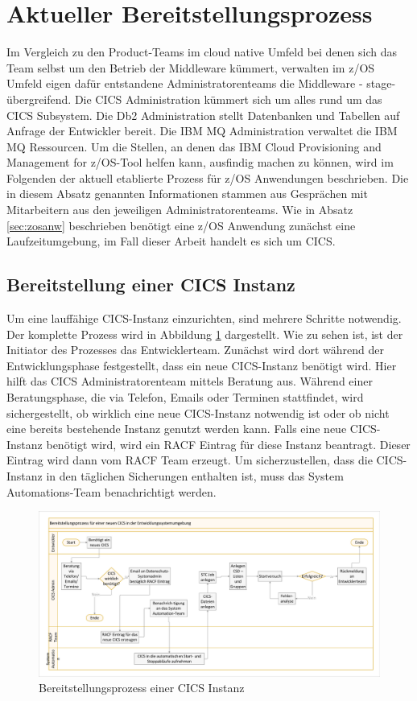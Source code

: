 \section{Aktueller Bereitstellungsprozess}\label{sec:aktbereit}
Im Vergleich zu den Product-Teams im cloud native Umfeld bei denen sich das Team selbst um den Betrieb der Middleware kümmert, verwalten im z/OS Umfeld eigen dafür entstandene Administratorenteams die Middleware - stage-übergreifend.
Die \glqq CICS Administration\grqq{} kümmert sich um alles rund um das CICS Subsystem.
Die \glqq Db2 Administration\grqq{} stellt Datenbanken und Tabellen auf Anfrage der Entwickler bereit.
Die \glqq IBM MQ Administration\grqq{} verwaltet die IBM MQ Ressourcen.
Um die Stellen, an denen das \glqq IBM Cloud Provisioning and Management for z/OS\grqq-Tool helfen kann, ausfindig machen zu können, wird im Folgenden der aktuell etablierte Prozess für z/OS Anwendungen beschrieben.
Die in diesem Absatz genannten Informationen stammen aus Gesprächen mit Mitarbeitern aus den jeweiligen Administratorenteams.
Wie in Absatz \ref{sec:zosanw} beschrieben benötigt eine z/OS Anwendung zunächst eine Laufzeitumgebung, im Fall dieser Arbeit handelt es sich um CICS.

\subsection{Bereitstellung einer CICS Instanz}\label{ssec:aktcics}
Um eine lauffähige CICS-Instanz einzurichten, sind mehrere Schritte notwendig.
Der komplette Prozess wird in Abbildung \ref{fig:aktcics} dargestellt.
Wie zu sehen ist, ist der Initiator des Prozesses das Entwicklerteam.
Zunächst wird dort während der Entwicklungsphase festgestellt, dass ein neue CICS-Instanz benötigt wird.
Hier hilft das CICS Administratorenteam mittels Beratung aus.
Während einer Beratungsphase, die via Telefon, Emails oder Terminen stattfindet, wird sichergestellt, ob wirklich eine neue CICS-Instanz notwendig ist oder ob nicht eine bereits bestehende Instanz genutzt werden kann.
Falls eine neue CICS-Instanz benötigt wird, wird ein RACF Eintrag für diese Instanz beantragt.
Dieser Eintrag wird dann vom RACF Team erzeugt.
Um sicherzustellen, dass die CICS-Instanz in den täglichen Sicherungen enthalten ist, muss das System Automations-Team benachrichtigt werden.

\begin{figure}[ht!]
\centering
\includegraphics[width=\paperwidth,angle=90]{figures/swimlaneCICS.pdf}
\caption{Bereitstellungsprozess einer CICS Instanz}
\label{fig:aktcics}
\end{figure}

